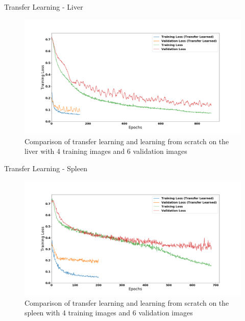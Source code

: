 \documentclass[10pt]{beamer}
\begin{document}
%
%

\begin{frame}[fragile]{Transfer Learning - Liver}
  
 \begin{figure}[h!]
    \centering
    \includegraphics[scale=0.21]{pictures/transferLiver}
    \caption{Comparison of transfer learning and learning from scratch on the liver with 4 training images and 6 validation images}
    \label{fig:liverPlot}
  \end{figure}
  
\end{frame}

\begin{frame}[fragile]{Transfer Learning - Spleen}
  
 \begin{figure}[h!]
    \centering
    \includegraphics[scale=0.22]{pictures/transferSpleen}
    \caption{Comparison of transfer learning and learning from scratch on the spleen with 4 training images and 6 validation images}
    \label{fig:spleenPlot}
  \end{figure}
  
\end{frame}
\end{document}
